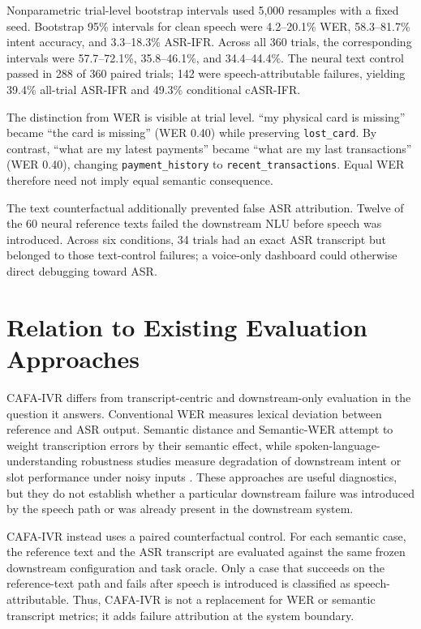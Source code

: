 \documentclass[9pt,twocolumn]{extarticle}
\begin{document}
Nonparametric trial-level bootstrap intervals used 5,000 resamples with a fixed seed. Bootstrap 95\% intervals for clean speech were 4.2--20.1\% WER, 58.3--81.7\% intent accuracy, and 3.3--18.3\% ASR-IFR. Across all 360 trials, the corresponding intervals were 57.7--72.1\%, 35.8--46.1\%, and 34.4--44.4\%. The neural text control passed in 288 of 360 paired trials; 142 were speech-attributable failures, yielding 39.4\% all-trial ASR-IFR and 49.3\% conditional cASR-IFR.

The distinction from WER is visible at trial level. ``my physical card is missing'' became ``the card is missing'' (WER 0.40) while preserving \texttt{lost\_card}. By contrast, ``what are my latest payments'' became ``what are my last transactions'' (WER 0.40), changing \texttt{payment\_history} to \texttt{recent\_transactions}. Equal WER therefore need not imply equal semantic consequence.

The text counterfactual additionally prevented false ASR attribution. Twelve of the 60 neural reference texts failed the downstream NLU before speech was introduced. Across six conditions, 34 trials had an exact ASR transcript but belonged to those text-control failures; a voice-only dashboard could otherwise direct debugging toward ASR.


\section{Relation to Existing Evaluation Approaches}

CAFA-IVR differs from transcript-centric and downstream-only evaluation in the question it answers. Conventional WER measures lexical deviation between reference and ASR output. Semantic distance and Semantic-WER attempt to weight transcription errors by their semantic effect, while spoken-language-understanding robustness studies measure degradation of downstream intent or slot performance under noisy inputs \cite{kim2021,roy2021,sengupta2021}. These approaches are useful diagnostics, but they do not establish whether a particular downstream failure was introduced by the speech path or was already present in the downstream system.

CAFA-IVR instead uses a paired counterfactual control. For each semantic case, the reference text and the ASR transcript are evaluated against the same frozen downstream configuration and task oracle. Only a case that succeeds on the reference-text path and fails after speech is introduced is classified as speech-attributable. Thus, CAFA-IVR is not a replacement for WER or semantic transcript metrics; it adds failure attribution at the system boundary.
\end{document}
